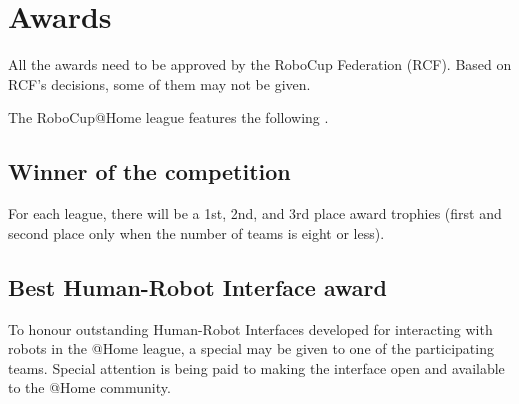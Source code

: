 \section{Awards}
\label{sec:awards}
All the awards need to be approved by the RoboCup Federation (RCF). Based on RCF's decisions, some of them may not be given.

The RoboCup@Home league features the following .

\subsection{Winner of the competition}
\label{award:winner}
For each league, there will be a 1st, 2nd, and 3rd place award trophies (first and second place only when the number of teams is eight or less).

%
%
%
%


%
%
\subsection{Best Human-Robot Interface award}
\label{award:hri}
To honour outstanding Human-Robot Interfaces developed for interacting with robots in the @Home league, a special  may be given to one of the participating teams. Special attention is being paid to making the interface open and available to the @Home community.

